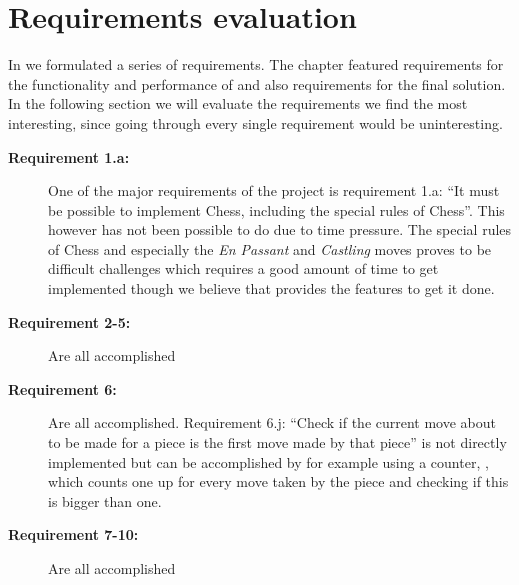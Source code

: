 \section{Requirements evaluation}
\label{sec:requirementsevaluation}

In  we formulated a series of requirements. The chapter featured requirements for the functionality and performance of \productname{} and also requirements for the final solution. In the following section we will evaluate the requirements we find the most interesting, since going through every single requirement would be uninteresting. 

\begin{description}
\item[\textbf{Requirement 1.a:}]
One of the major requirements of the project is requirement 1.a: ``It must be possible to implement Chess, including the special rules of Chess''. This however has not been possible to do due to time pressure. The special rules of Chess and especially the \emph{En Passant} and \emph{Castling} moves proves to be difficult challenges which requires a good amount of time to get implemented though we believe that \productname{} provides the features to get it done.

\item[\textbf{Requirement 2-5:}]
Are all accomplished

\item[\textbf{Requirement 6:}]
Are all accomplished. Requirement 6.j: ``Check if the current move about to be made for a piece is the first move made by that piece'' is not directly implemented but can be accomplished by for example using a counter, , which counts one up for every move taken by the piece and checking if this is bigger than one.

\item[\textbf{Requirement 7-10:}]
Are all accomplished





\end{description} 